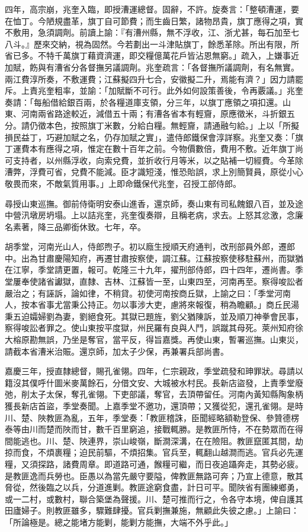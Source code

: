 \begin{pinyinscope}
四年，高宗崩，兆奎入臨，即授漕運總督。固辭，不許。旋奏言：「整頓漕運，要在恤丁。今陋規盡革，旗丁自可節費；而生齒日繁，諸物昂貴，旗丁應得之項，實不敷用，急須調劑。前讀上諭：『有漕州縣，無不浮收，江、浙尤甚，每石加至七八斗。』歷來交納，視為固然。今若劃出一斗津貼旗丁，餘悉革除。所出有限，所省已多。不特千萬旗丁藉資濟運，即交糧億萬花戶皆沾恩無窮。」疏入，上嫌事近加賦，飭與有漕省分各督撫另議調劑。兆奎疏言：「各督撫所議調劑，有名無實。兩江費淳所奏，不敷運費；江蘇擬四升七合，安徽擬二升，焉能有濟？」因力請罷斥。上責兆奎粗率，並諭：「加賦斷不可行。此外如何設策善後，令再覈議。」兆奎奏請：「每船借給銀百兩，於各糧道庫支領，分三年，以旗丁應領之項扣還。山東、河南兩省路途較近，減借五十兩；有漕各省本有輕齎，原應徵米，斗折銀五分。請仍徵本色，按照旗丁米數，分給白糧。無輕齎，請通融勻給。」上以「所擬損民益丁，巧避加賦之名，仍存加賦之實」，遣侍郎鐵保會淳詳察。兆奎又奏：「旗丁運費本有應得之項，惟定在數十百年之前。今物價數倍，費用不敷。近年旗丁尚可支持者，以州縣浮收，向索兌費，並折收行月等米，以之貼補一切經費。今革除漕弊，浮費可省，兌費不能減。臣才識短淺，惟恐貽誤，求上別簡賢員，原從小心敬畏而來，不敵氣質用事。」上即命鐵保代兆奎，召授工部侍郎。

尋授山東巡撫。御前侍衛明安泰山進香，還京師，奏山東有司私餽銀八百，並及途中營汛墩房坍塌。上以詰兆奎，兆奎復奏辯，且稱老病，求去。上怒其忿激，念廉名素著，降三品卿銜休致。七年，卒。

胡季堂，河南光山人，侍郎煦子。初以廕生授順天府通判，改刑部員外郎，遷郎中。出為甘肅慶陽知府，再遷甘肅按察使，調江蘇。江蘇按察使移駐蘇州，而獄猶在江寧，季堂請更置，報可。乾隆三十九年，擢刑部侍郎，四十四年，遷尚書。季堂屢奉使諸省讞獄，直隸、吉林、江蘇皆一至，山東四至，河南再至。察得唆訟者嚴治之；有誣訴，論如律，不稍貸。初使河南按商丘獄，上諭之曰：「季堂河南人，按本省事尤當秉公持正。勿以事涉大吏，慮將來報復，稍為瞻顧。」商丘民湯秉五迫孀婦劉為妻，劉絕食死。其獄已題旌，劉父猶陳訴，並及順刀神拳會民事，察得唆訟者罪之。使山東按平度獄，州民羅有良與人鬥，誤蹴其母死。萊州知府徐大榕原勘無誤，乃坐是奪官，當平反，得旨嘉獎。再使山東，暫署巡撫。山東災，請截本省漕米治賑。還京師，加太子少保，再兼署兵部尚書。

嘉慶三年，授直隸總督，賜孔雀翎。四年，仁宗親政，季堂疏發和珅罪狀。尋請以籍沒其僕呼什圖米麥萬餘石，分借文安、大城被水村民。長新店盜發，上責季堂廢弛，削太子太保，奪孔雀翎。下吏部議，奪官，去頂帶留任。河南內黃知縣陶象柄獲長新店首盜，季堂奏聞。上嘉季堂不邀功，還頂帶；又獲從犯，還孔雀翎。是時川、楚、陜教匪為亂，五年，季堂奏：「教匪稽誅，臣聞經略額勒登保、參贊德楞泰等由川而楚而陜而甘，數千百里窮追，接戰輒勝。是教匪所恃，不在勢眾而在得間能逃也。川、楚、陜連界，崇山峻嶺，斷澗深溝，在在險阻。教匪竄匿其間，劫掠而食，不煩裹糧；迫民前驅，不煩招集。官兵至，輒翻山越澗而逃。官兵必先運糧，又須探路，諸費周章。即道路可通，餱糧可繼，而日夜追躡奔走，其勢必疲。是教匪逸而兵勞也。臣愚以為當先嚴守要隘，俾教匪無路可奔；乃宣上德意，散其脅從，然後臨之以兵，分道進剿。教匪途窮食盡，計日可平。聞陜省有團練鄉勇，或一二村，或數村，聯合築堡為聲援。川、楚可推而行之，令各守本境，俾自護其田廬婦子。則教匪雖多，驟難肆擾。官兵剿撫兼施，無顧此失彼之慮。」上諭曰：「所論極是。總之能堵方能剿，能剿方能撫，大端不外乎此。」


\end{pinyinscope}
